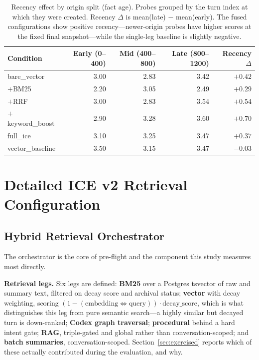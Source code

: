 \documentclass[twoside,11pt]{article}
\begin{document}
\begin{table}[tbp]
\centering
\small


\begin{tabular}{@{}lrrrr@{}}
\toprule
\textbf{Condition} & \textbf{Early (0--400)} & \textbf{Mid (400--800)} & \textbf{Late (800--1200)} & \textbf{Recency $\Delta$} \\
\midrule
bare\_vector       & 3.00 & 2.83 & 3.42 & $+0.42$ \\
$+$BM25            & 2.20 & 3.05 & 2.49 & $+0.29$ \\
$+$RRF             & 3.00 & 2.83 & 3.54 & $+0.54$ \\
$+$keyword\_boost  & 2.90 & 3.28 & 3.60 & $+0.70$ \\
full\_ice          & 3.10 & 3.25 & 3.47 & $+0.37$ \\
vector\_baseline   & 3.50 & 3.15 & 3.47 & $-0.03$ \\
\bottomrule
\end{tabular}
\caption{Recency effect by origin split (fact age). Probes grouped by the turn index at which they were created. Recency $\Delta$ is mean(late) $-$ mean(early). The fused configurations show positive recency---newer-origin probes have higher scores at the fixed final snapshot---while the single-leg baseline is slightly negative.}
\label{tab:ablation-recency}
\end{table}

\FloatBarrier
\section{Detailed ICE v2 Retrieval Configuration}
\subsection{Hybrid Retrieval Orchestrator}
\label{app:orchestrator}

The orchestrator is the core of pre-flight and the component this study measures most directly.

\textbf{Retrieval legs.} Six legs are defined: \textbf{BM25} over a Postgres tsvector of raw and summary text, filtered on decay score and archival status; \textbf{vector} with decay weighting, scoring $(1 - (\text{embedding} \Leftrightarrow \text{query}))\cdot\text{decay\_score}$, which is what distinguishes this leg from pure semantic search---a highly similar but decayed turn is down-ranked; \textbf{Codex graph traversal}; \textbf{procedural} behind a hard intent gate; \textbf{RAG}, triple-gated and global rather than conversation-scoped; and \textbf{batch summaries}, conversation-scoped. Section~\ref{sec:exercised} reports which of these actually contributed during the evaluation, and why.
\end{document}
